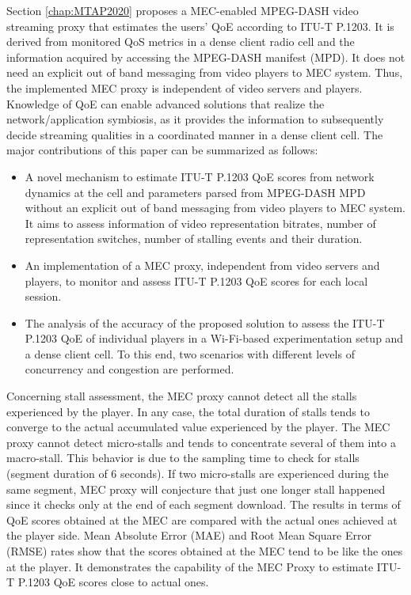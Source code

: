 Section \ref{chap:MTAP2020} proposes a MEC-enabled MPEG-DASH video streaming proxy that estimates the users' QoE according to ITU-T P.1203. It is derived from monitored QoS metrics in a dense client radio cell and the information acquired by accessing the MPEG-DASH manifest (MPD). It does not need an explicit out of band messaging from video players to MEC system. Thus, the implemented MEC proxy is independent of video servers and players. Knowledge of QoE can enable advanced solutions that realize the network/application symbiosis, as it provides the information to subsequently decide streaming qualities in a coordinated manner in a dense client cell. The major contributions of this paper can be summarized as follows:
\begin{itemize}
	\item A novel mechanism to estimate ITU-T P.1203 QoE scores from network dynamics at the cell and parameters parsed from MPEG-DASH MPD without an explicit out of band messaging from video players to MEC system. It aims to assess information of video representation bitrates, number of representation switches, number of stalling events and their duration.
	\item An implementation of a MEC proxy, independent from video servers and players, to monitor and assess ITU-T P.1203 QoE scores for each local session.
	\item The analysis of the accuracy of the proposed solution to assess the ITU-T P.1203 QoE of individual players in a Wi-Fi-based experimentation setup and a dense client cell. To this end, two scenarios with different levels of concurrency and congestion are performed.
\end{itemize}
Concerning stall assessment, the MEC proxy cannot detect all the stalls experienced by the player. In any case, the total duration of stalls tends to converge to the actual accumulated value experienced by the player. The MEC proxy cannot detect micro-stalls and tends to concentrate several of them into a macro-stall. This behavior is due to the sampling time to check for stalls (segment duration of 6 seconds). If two micro-stalls are experienced during the same segment, MEC proxy will conjecture that just one longer stall happened since it checks only at the end of each segment download.
The results in terms of QoE scores obtained at the MEC are compared with the actual ones achieved at the player side. Mean Absolute Error (MAE) and Root Mean Square Error (RMSE) rates show that the scores obtained at the MEC tend to be like the ones at the player. It demonstrates the capability of the MEC Proxy to estimate ITU-T P.1203 QoE scores close to actual ones.

